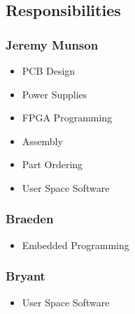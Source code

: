 \subsection{Responsibilities}
	\subsubsection{Jeremy Munson}
		\begin{itemize}
			\item PCB Design
			\item Power Supplies
			\item FPGA Programming
			\item Assembly
			\item Part Ordering
			\item User Space Software
		\end{itemize}

	\subsubsection{Braeden}
		\begin{itemize}
			\item Embedded Programming
		\end{itemize}
		
	\subsubsection{Bryant}
		\begin{itemize}
			\item User Space Software
		\end{itemize}